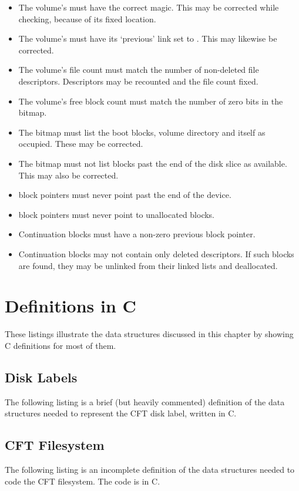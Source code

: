 \begin{itemize}
  \item The volume's  must have the correct magic. This may be
    corrected while checking, because of its fixed location.
  \item The volume's  must have its ‘previous’ link set to
    . This may likewise be corrected.
  \item The volume's file count must match the number of non-deleted file
    descriptors. Descriptors may be recounted and the file count fixed.
  \item The volume's free block count must match the number of zero bits in the
    bitmap.
  \item The bitmap must list the boot blocks, volume directory and itself as
    occupied. These may be corrected.
  \item The bitmap must not list blocks past the end of the disk slice as
    available. This may also be corrected.
  \item \glspl{block pointer} must never point past the end of the device.
  \item \glspl{block pointer} must never point to unallocated blocks.
  \item Continuation blocks must have a non-zero previous \gls{block pointer}.
  \item Continuation blocks may not contain only deleted descriptors. If such
    blocks are found, they may be unlinked from their linked lists and
    deallocated.
\end{itemize}

\section{Definitions in C}

These listings illustrate the data structures discussed in this chapter by
showing C definitions for most of them.

\subsection{Disk Labels}

The following listing is a brief (but heavily commented) definition of the data
structures needed to represent the CFT disk label, written in C.


\pagebreak

\subsection{CFT Filesystem}

The following listing is an incomplete definition of the data structures needed to
code the CFT filesystem. The code is in C.



